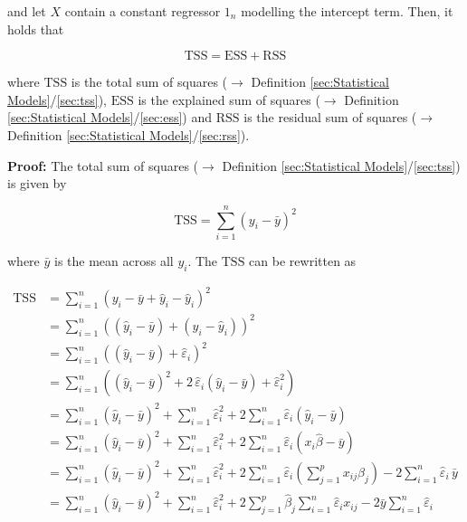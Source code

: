 \documentclass[a4paper,12pt,twoside]{book}
\begin{document}
and let $X$ contain a constant regressor $1_n$ modelling the intercept term. Then, it holds that

\begin{equation} \label{eq:mlr-pss-pss}
\mathrm{TSS} = \mathrm{ESS} + \mathrm{RSS}
\end{equation}

where $\mathrm{TSS}$ is the total sum of squares ($\rightarrow$ Definition \ref{sec:Statistical Models}/\ref{sec:tss}), $\mathrm{ESS}$ is the explained sum of squares ($\rightarrow$ Definition \ref{sec:Statistical Models}/\ref{sec:ess}) and $\mathrm{RSS}$ is the residual sum of squares ($\rightarrow$ Definition \ref{sec:Statistical Models}/\ref{sec:rss}).


\vspace{1em}
\textbf{Proof:} The total sum of squares ($\rightarrow$ Definition \ref{sec:Statistical Models}/\ref{sec:tss}) is given by

\begin{equation} \label{eq:mlr-pss-TSS}
\mathrm{TSS} = \sum_{i=1}^{n} (y_i - \bar{y})^2
\end{equation}

where $\bar{y}$ is the mean across all $y_i$. The $\mathrm{TSS}$ can be rewritten as

\begin{equation} \label{eq:mlr-pss-TSS-s1}
\begin{split}
\mathrm{TSS} &= \sum_{i=1}^{n} (y_i - \bar{y} + \hat{y}_i - \hat{y}_i)^2 \\
&= \sum_{i=1}^{n} \left( (\hat{y}_i - \bar{y}) + (y_i - \hat{y}_i) \right)^2 \\
&= \sum_{i=1}^{n} \left( (\hat{y}_i - \bar{y}) + \hat{\varepsilon}_i \right)^2 \\
&= \sum_{i=1}^{n} \left( (\hat{y}_i - \bar{y})^2 + 2 \, \hat{\varepsilon}_i (\hat{y}_i - \bar{y}) + \hat{\varepsilon}_i^2 \right) \\
&= \sum_{i=1}^{n} (\hat{y}_i - \bar{y})^2 + \sum_{i=1}^{n} \hat{\varepsilon}_i^2 + 2 \sum_{i=1}^{n} \hat{\varepsilon}_i (\hat{y}_i - \bar{y}) \\
&= \sum_{i=1}^{n} (\hat{y}_i - \bar{y})^2 + \sum_{i=1}^{n} \hat{\varepsilon}_i^2 + 2 \sum_{i=1}^{n} \hat{\varepsilon}_i (x_i \hat{\beta} - \bar{y}) \\
&= \sum_{i=1}^{n} (\hat{y}_i - \bar{y})^2 + \sum_{i=1}^{n} \hat{\varepsilon}_i^2 + 2 \sum_{i=1}^{n} \hat{\varepsilon}_i \left( \sum_{j=1}^{p} x_{ij} \hat{\beta}_j \right) - 2 \sum_{i=1}^{n} \hat{\varepsilon}_i \, \bar{y} \\
&= \sum_{i=1}^{n} (\hat{y}_i - \bar{y})^2 + \sum_{i=1}^{n} \hat{\varepsilon}_i^2 + 2 \sum_{j=1}^{p} \hat{\beta}_j \sum_{i=1}^{n} \hat{\varepsilon}_i x_{ij} - 2 \bar{y} \sum_{i=1}^{n} \hat{\varepsilon}_i \\
\end{split}
\end{equation}
\end{document}
